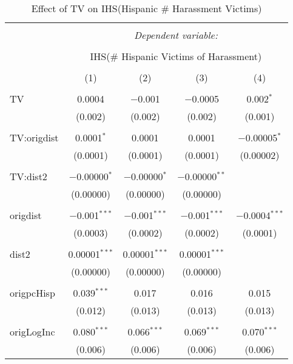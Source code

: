 
\begin{table}[!htbp] \centering 
  \caption{Effect of TV on IHS(Hispanic \# Harassment Victims)} 
  \label{} 
\begin{tabular}{@{\extracolsep{-2pt}}lcccc} 
\\[-1.8ex]\hline 
\hline \\[-1.8ex] 
 & \multicolumn{4}{c}{\textit{Dependent variable:}} \\ 
\cline{2-5} 
\\[-1.8ex] & \multicolumn{4}{c}{IHS(\# Hispanic Victims of Harassment)} \\ 
\\[-1.8ex] & (1) & (2) & (3) & (4)\\ 
\hline \\[-1.8ex] 
 TV & 0.0004 & $-$0.001 & $-$0.0005 & 0.002$^{*}$ \\ 
  & (0.002) & (0.002) & (0.002) & (0.001) \\ 
  & & & & \\ 
 TV:origdist & 0.0001$^{*}$ & 0.0001 & 0.0001 & $-$0.00005$^{*}$ \\ 
  & (0.0001) & (0.0001) & (0.0001) & (0.00002) \\ 
  & & & & \\ 
 TV:dist2 & $-$0.00000$^{*}$ & $-$0.00000$^{*}$ & $-$0.00000$^{**}$ &  \\ 
  & (0.00000) & (0.00000) & (0.00000) &  \\ 
  & & & & \\ 
 origdist & $-$0.001$^{***}$ & $-$0.001$^{***}$ & $-$0.001$^{***}$ & $-$0.0004$^{***}$ \\ 
  & (0.0003) & (0.0002) & (0.0002) & (0.0001) \\ 
  & & & & \\ 
 dist2 & 0.00001$^{***}$ & 0.00001$^{***}$ & 0.00001$^{***}$ &  \\ 
  & (0.00000) & (0.00000) & (0.00000) &  \\ 
  & & & & \\ 
 origpcHisp & 0.039$^{***}$ & 0.017 & 0.016 & 0.015 \\ 
  & (0.012) & (0.013) & (0.013) & (0.013) \\ 
  & & & & \\ 
 origLogInc & 0.080$^{***}$ & 0.066$^{***}$ & 0.069$^{***}$ & 0.070$^{***}$ \\ 
  & (0.006) & (0.006) & (0.006) & (0.006) \\ 

\end{tabular}
\end{table}
